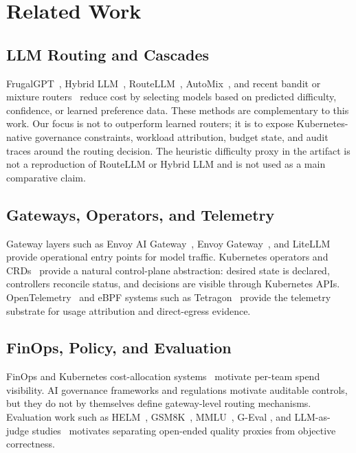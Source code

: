 \documentclass[10pt,journal,compsoc]{IEEEtran}
\begin{document}
\section{Related Work}

\subsection{LLM Routing and Cascades}
FrugalGPT~\cite{chen2023frugalgpt}, Hybrid LLM~\cite{ding2024hybridllm},
RouteLLM~\cite{ong2024routellm}, AutoMix~\cite{aggarwal2024automix}, and recent
bandit or mixture routers~\cite{li2025llmbandit,wang2025mixllm} reduce cost by
selecting models based on predicted difficulty, confidence, or learned
preference data. These methods are complementary to this work. Our focus is not
to outperform learned routers; it is to expose Kubernetes-native governance
constraints, workload attribution, budget state, and audit traces around the
routing decision. The heuristic difficulty proxy in the artifact is not a
reproduction of RouteLLM or Hybrid LLM and is not used as a main comparative
claim.

\subsection{Gateways, Operators, and Telemetry}
Gateway layers such as Envoy AI Gateway~\cite{envoyaigateway}, Envoy
Gateway~\cite{envoygateway}, and LiteLLM~\cite{litellm} provide operational
entry points for model traffic. Kubernetes operators and CRDs~\cite{
kubernetesoperators,kubernetescrd} provide a natural control-plane abstraction:
desired state is declared, controllers reconcile status, and decisions are
visible through Kubernetes APIs. OpenTelemetry~\cite{opentelemetry} and eBPF
systems such as Tetragon~\cite{tetragon} provide the telemetry substrate for
usage attribution and direct-egress evidence.

\subsection{FinOps, Policy, and Evaluation}
FinOps and Kubernetes cost-allocation systems~\cite{finopsframework,opencost}
motivate per-team spend visibility. AI governance frameworks and regulations
\cite{nistairmf2023,nistgenai2024,owaspllm2025,iso42001,euaiact2024,gdpr2016}
motivate auditable controls, but they do not by themselves define gateway-level
routing mechanisms. Evaluation work such as HELM~\cite{liang2022helm},
GSM8K~\cite{cobbe2021gsm8k}, MMLU~\cite{hendrycks2021mmlu}, G-Eval
\cite{liu2023geval}, and LLM-as-judge studies~\cite{zheng2023judge} motivates
separating open-ended quality proxies from objective correctness.
\end{document}
